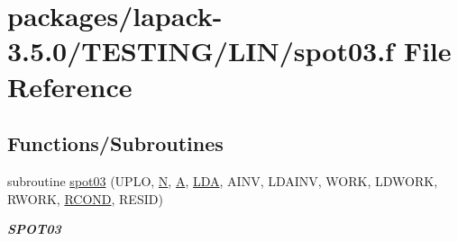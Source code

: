 \hypertarget{spot03_8f}{}\section{packages/lapack-\/3.5.0/\+T\+E\+S\+T\+I\+N\+G/\+L\+I\+N/spot03.f File Reference}
\label{spot03_8f}
\subsection*{Functions/\+Subroutines}
\begin{DoxyCompactItemize}
\item 
subroutine \hyperlink{group__single__lin_ga39a7c6e7426c6a3f502c7b0b87724f8e}{spot03} (U\+P\+L\+O, \hyperlink{polmisc_8c_a0240ac851181b84ac374872dc5434ee4}{N}, \hyperlink{classA}{A}, \hyperlink{example__user_8c_ae946da542ce0db94dced19b2ecefd1aa}{L\+D\+A}, A\+I\+N\+V, L\+D\+A\+I\+N\+V, W\+O\+R\+K, L\+D\+W\+O\+R\+K, R\+W\+O\+R\+K, \hyperlink{superlu__enum__consts_8h_af00a42ecad444bbda75cde1b64bd7e72a9b5c151728d8512307565994c89919d5}{R\+C\+O\+N\+D}, R\+E\+S\+I\+D)
\begin{DoxyCompactList}\small\item\em {\bfseries S\+P\+O\+T03} \end{DoxyCompactList}\end{DoxyCompactItemize}
